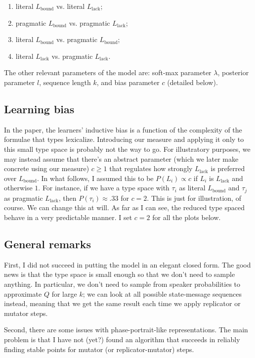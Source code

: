 \documentclass[fleqn,reqno,10pt]{article}
\newcommand{\mylang}[1]{\ensuremath{L_{\text{#1}}}\xspace} %
\newcommand{\Lbound}{\mylang{bound}}
\newcommand{\Llack}{\mylang{lack}}
\begin{document}
\begin{enumerate}
  \item literal $\Lbound$ vs. literal $\Llack$;
  \item pragmatic $\Lbound$ vs. pragmatic $\Llack$;
  \item literal $\Lbound$ vs. pragmatic $\Lbound$;
  \item literal $\Llack$ vs. pragmatic $\Llack$.
\end{enumerate}

The other relevant parameters of the model are: soft-max parameter $\lambda$, posterior parameter $l$, sequence length $k$, and bias parameter $c$ (detailed below).

\subsection*{Learning bias}
In the paper, the learners' inductive bias is a function of the complexity of the formulae that types lexicalize. Introducing our measure and applying it only to this small type space is probably not the way to go. For illustratory purposes, we may instead assume that there's an abstract parameter (which we later make concrete using our measure) $c \geq 1$ that regulates how strongly $\Llack$ is preferred over $\Lbound$. In what follows, I assumed this to be $P(L_i) \propto c$ if $L_i$ is $\Llack$ and otherwise $1$. For instance, if we have  a type space with $\tau_i$ as literal $\Lbound$ and $\tau_j$ as pragmatic $\Llack$, then $P(\tau_i) \approx .33$ for $c = 2$. This is just for illustration, of course. We can change this at will. As far as I can see, the reduced type spaced behave in a very predictable manner. I set $c = 2$ for all the plots below.

\subsection*{General remarks}
First, I did not succeed in putting the model in an elegant closed form. The good news is that the type space is small enough so that we don't need to sample anything. In particular, we don't need to sample from speaker probabilities to approximate $Q$ for large $k$; we can look at all possible state-message sequences instead, meaning that we get the same result each time we apply replicator or mutator steps. 

Second, there are some issues with phase-portrait-like representations. The main problem is that I have not (yet?) found an algorithm that succeeds in reliably finding stable points for mutator (or replicator-mutator) steps. 
\end{document}
